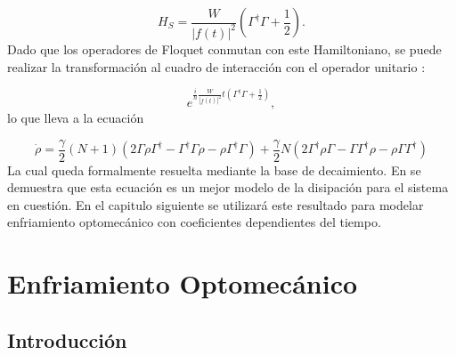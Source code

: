 \documentclass[a4paper,10pt]{report}
\begin{document}
\begin{equation}
H_S = \frac{W}{|f(t)|^2}(\Gamma^\dagger \Gamma + \frac{1}{2}).
\end{equation} Dado que los operadores de Floquet conmutan con este Hamiltoniano, se puede realizar la transformación al cuadro de interacción con el operador unitario \cite{SakuraiQM}:

\begin{equation}
 e^{\frac{i}{\hbar}\frac{W}{|f(t)|^2}t(\Gamma^\dagger \Gamma + \frac{1}{2})},
\end{equation}lo que lleva a la ecuación

\begin{equation} \label{GammaLindblat}
\dot{\rho}=\frac{\gamma}{2}(N+1)(2\Gamma\rho\Gamma^\dagger - \Gamma^\dagger\Gamma \rho - \rho \Gamma^\dagger \Gamma )
 + \frac{\gamma}{2}N(2\Gamma^\dagger \rho \Gamma - \Gamma \Gamma^\dagger \rho - \rho \Gamma\Gamma^\dagger)
\end{equation}La cual queda formalmente resuelta mediante la base de decaimiento. En \cite{HanngiFM} se demuestra que esta ecuación es un mejor modelo de la disipación para el sistema en cuestión. En el capitulo siguiente se utilizará este resultado para modelar enfriamiento optomecánico con coeficientes dependientes del tiempo.


\chapter{Enfriamiento Optomecánico}

\section{Introducción}
\end{document}
